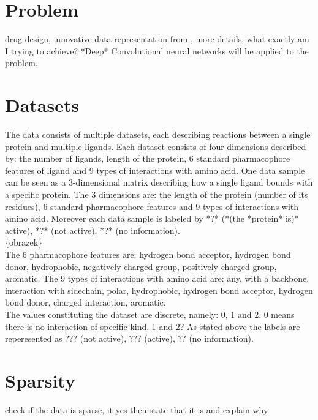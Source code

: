 \documentclass[a4paper,10pt]{report}
\begin{document}
    \section{Problem} %
    drug design, innovative data representation from \cite{2DSIFT}, more details, what exactly am I trying to achieve? *Deep* Convolutional neural networks will be applied to the problem.
    
    \section{Datasets}
    The data consists of multiple datasets, each describing reactions between a single protein and multiple ligands. Each dataset consists of four dimensions described by: the number of ligands, length of the protein, 6 standard pharmacophore features of ligand and 9 types of interactions with amino acid\cite{2DSIFT}. One data sample can be seen as a 3-dimensional matrix describing how a single ligand bounds with a specific protein. The 3 dimensions are: the length of the protein (number of its residues), 6 standard pharmacophore features and 9 types of interactions with amino acid. Moreover each data sample is labeled by *?* (*(the *protein* is)* active), *?* (not active), *?* (no information). \\

    \{obrazek\} \\ %
    
    The 6 pharmacophore features are: hydrogen bond acceptor, hydrogen bond donor, hydrophobic, negatively charged group, positively charged group, aromatic. The 9 types of interactions with amino acid are: any, with a backbone, interaction with sidechain, polar, hydrophobic, hydrogen bond acceptor, hydrogen bond donor, charged interaction, aromatic. \\
    
    The values constituting the dataset are discrete, namely: 0, 1 and 2. 0 means there is no interaction of specific kind. 1 and 2? As stated above the labels are reperesented as ??? (not active), ??? (active), ?? (no information).
    
    
    \section{Sparsity} %
    check if the data is sparse, it yes then state that it is and explain why
    
\end{document}
